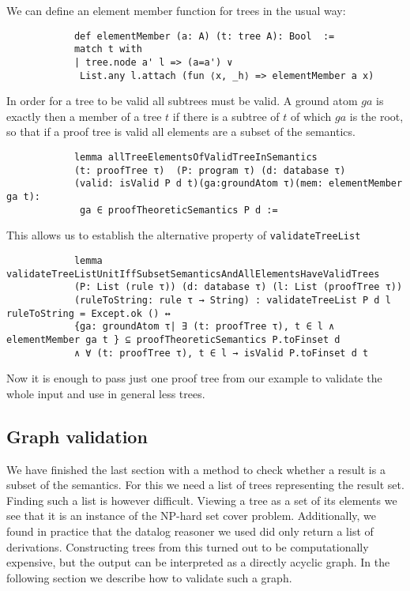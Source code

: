 \documentclass{article}
\begin{document}
        We can define an element member function for trees in the usual way:

        \begin{lstlisting}
            def elementMember (a: A) (t: tree A): Bool  :=
            match t with
            | tree.node a' l => (a=a') ∨
             List.any l.attach (fun ⟨x, _h⟩ => elementMember a x)
        \end{lstlisting}
        In order for a tree to be valid all subtrees must be valid. A ground atom $ga$ is exactly then a member of a tree $t$ if there is a subtree of $t$ of which $ga$ is the root, so that if a proof tree is valid all elements are a subset of the semantics.

        \begin{lstlisting}
            lemma allTreeElementsOfValidTreeInSemantics 
            (t: proofTree τ)  (P: program τ) (d: database τ) 
            (valid: isValid P d t)(ga:groundAtom τ)(mem: elementMember ga t):
             ga ∈ proofTheoreticSemantics P d :=
        \end{lstlisting}

        This allows us to establish the alternative property of \texttt{validateTreeList}

        \begin{lstlisting}
            lemma validateTreeListUnitIffSubsetSemanticsAndAllElementsHaveValidTrees 
            (P: List (rule τ)) (d: database τ) (l: List (proofTree τ)) 
            (ruleToString: rule τ → String) : validateTreeList P d l  ruleToString = Except.ok () ↔
            {ga: groundAtom τ| ∃ (t: proofTree τ), t ∈ l ∧ elementMember ga t } ⊆ proofTheoreticSemantics P.toFinset d 
            ∧ ∀ (t: proofTree τ), t ∈ l → isValid P.toFinset d t
        \end{lstlisting}

        Now it is enough to pass just one proof tree from our example to validate the whole input and use in general less trees. 

        \subsection{Graph validation}

        We have finished the last section with a method to check whether a result is a subset of the semantics. For this we need a list of trees representing the result set. Finding such a list is however difficult. Viewing a tree as a set of its elements we see that it is an instance of the NP-hard set cover problem. Additionally, we found in practice that the datalog reasoner we used did only return a list of derivations. Constructing trees from this turned out to be computationally expensive, but the output can be interpreted as a directly acyclic graph. In the following section we describe how to validate such a graph.
\end{document}
